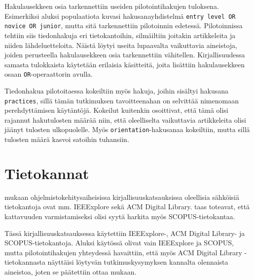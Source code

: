 \documentclass[utf8]{gradu3}
\begin{document}
Hakulausekkeen osia tarkennettiin useiden pilotointihakujen tuloksena. Esimerkiksi aluksi populaatiota kuvasi hakusanayhdistelmä {\tt entry level OR novice OR junior}, mutta sitä tarkennettiin pilotoinnin edetessä. Pilotoinnissa tehtiin siis tiedonhakuja eri tietokantoihin, silmäiltiin joitakin artikkeleita ja niiden lähdeluetteloita. Näistä löytyi useita lupaavalta vaikuttavia aineistoja, joiden perusteella hakulausekkeen osia tarkennettiin vähitellen. Kirjallisuudessa samasta tulokkaista käytetään erilaisia käsitteitä, joita lisättiin hakulausekkeen osaan {\tt OR}-operaattorin avulla.

Tiedonhakua pilotoitaessa kokeiltiin myös hakuja, joihin sisältyi hakusana {\tt practices}, sillä tämän tutkimuksen tavoitteenahan on selvittää nimenomaan perehdyttämisen käytäntöjä. Kokeilut kuitenkin osoittivat, että tämä olisi rajannut hakutulosten määrää niin, että oleelliselta vaikuttavia artikkeleita olisi jäänyt tulosten ulkopuolelle. Myös {\tt orientation}-hakusanaa kokeiltiin, mutta sillä tulosten määrä kasvoi satoihin tuhansiin.

\section{Tietokannat}

\textcite{brereton-ym-2007} mukaan ohjelmistokehitysaiheisissa kirjallisuuskatsauksissa oleellisia sähköisiä tietokantoja ovat mm. IEEExplore sekä ACM Digital Library. \textcite{kitchenham-charters-2007} taas toteavat, että kattavuuden varmistamiseksi olisi syytä harkita myös SCOPUS-tietokantaa.

Tässä kirjallisuuskatsauksessa käytettiin IEEExplore-, ACM Digital Library- ja SCOPUS-tietokantoja. Aluksi käytössä olivat vain IEEExplore ja SCOPUS, mutta pilotointihakujen yhteydessä havaittiin, että myös ACM Digital Library -tietokannasta näyttäisi löytyvän tutkimuskysymyksen kannalta olennaista aineistoa, joten se päätettiin ottaa mukaan.
\end{document}
